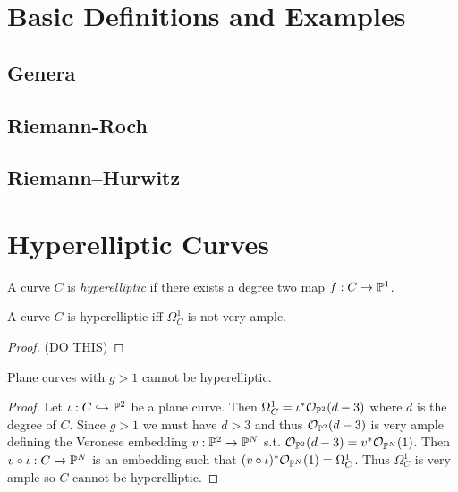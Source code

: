 \documentclass[12pt]{article}
\begin{document}
\newcommand{\g}[2]{\mathfrak{g}^{#1}_{#2}}

\section{Basic Definitions and Examples}

\subsection{Genera}

\subsection{Riemann-Roch}

\subsection{Riemann–Hurwitz}

\section{Hyperelliptic Curves}

\begin{defn}
A curve $C$ is \textit{hyperelliptic} if there exists a degree two map $f : C \to \P^1$. 
\end{defn}

\begin{lemma}
A curve $C$ is hyperelliptic iff $\Omega_C^1$ is not very ample.
\end{lemma}

\begin{proof}
(DO THIS)
\end{proof}

\begin{prop}
Plane curves with $g > 1$ cannot be hyperelliptic.
\end{prop}

\begin{proof}
Let $\iota : C \embed \P^2$ be a plane curve. Then $\Omega^1_C = \iota^* \struct{\P^2}(d - 3)$ where $d$ is the degree of $C$. Since $g > 1$ we must have $d > 3$ and thus $\struct{\P^2}(d - 3)$ is very ample defining the Veronese embedding $v : \P^2 \to \P^N$ s.t. $\struct{\P^2}(d - 3) = v^* \struct{\P^N}(1)$. Then $v \circ \iota : C \to \P^N$ is an embedding such that $(v \circ \iota)^* \struct{\P^N}(1) = \Omega^1_C$. Thus $\Omega^1_C$ is very ample so $C$ cannot be hyperelliptic.  
\end{proof}
\end{document}
